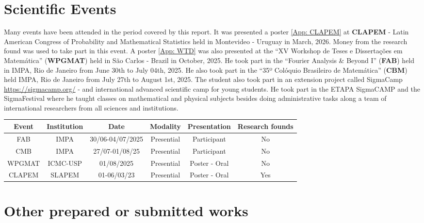 \documentclass[12pt]{report}
\begin{document}
\chapter{Scientific Events}\label{chp:particEvento}

Many events have been attended in the period covered by this report. It was presented a poster \eqref{App: CLAPEM} at \textbf{CLAPEM} - Latin American Congress of Probability and Mathematical Statistics held in Montevideo - Uruguay in March, 2026. Money from the research found was used to take part in this event.  A poster \eqref{App: WTD} was also presented at the \enquote{XV Workshop de Teses e Dissertações em Matemática} (\textbf{WPGMAT}) held in São Carlos - Brazil in October, 2025. He took part in the \enquote{Fourier Analysis \& Beyond I} (\textbf{FAB}) held in IMPA, Rio de Janeiro from June 30th to July 04th, 2025. He also took part in the \enquote{35º Colóquio Brasileiro de Matemática} (\textbf{CBM}) held IMPA, Rio de Janeiro from July 27th to August 1st, 2025. The student also took part in an extension project called SigmaCamp \url{https://sigmacamp.org/} - and international advanced scientific camp for young students. He took part in the ETAPA SigmaCAMP and the SigmaFestival where he taught classes on mathematical and physical subjects besides doing administrative tasks along a team of international researchers from all sciences and institutions.

\hspace{1cm}

\begin{center}
	\begin{tabular}{|c|c|c|c|c|c|}
		\hline
		Event &  Institution & Date & Modality & Presentation & Research founds \\
		\hline
			FAB & IMPA & 30/06-04/07/2025 & Presential & Participant& No \\
		\hline
			CMB & IMPA & 27/07-01/08/25 & Presential & Participant & No \\
		\hline
			WPGMAT & ICMC-USP & 01/08/2025 & Presential & Poster - Oral & No \\
		\hline
			CLAPEM & SLAPEM & 01-06/03/23 & Presential & Poster - Oral & Yes \\
		\hline
	\end{tabular}
\end{center}


\chapter{Other prepared or submitted works}
\end{document}
